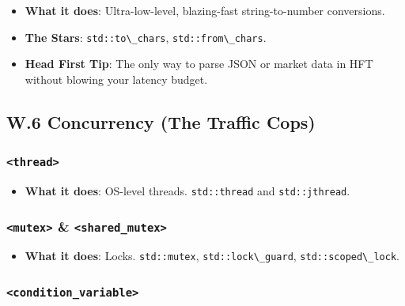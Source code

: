 \begin{itemize}
\tightlist
\item
  \textbf{What it does}: Ultra-low-level, blazing-fast string-to-number
  conversions.
\item
  \textbf{The Stars}: \passthrough{\lstinline!std::to\_chars!},
  \passthrough{\lstinline!std::from\_chars!}.
\item
  \textbf{Head First Tip}: The only way to parse JSON or market data in
  HFT without blowing your latency budget.
\end{itemize}

\hypertarget{w.6-concurrency-the-traffic-cops}{%
\subsection{W.6 Concurrency (The Traffic
Cops)}\label{w.6-concurrency-the-traffic-cops}}

\hypertarget{thread}{%
\subsubsection{\texorpdfstring{\texttt{\textless{}thread\textgreater{}}}{\textless thread\textgreater{}}}\label{thread}}

\begin{itemize}
\tightlist
\item
  \textbf{What it does}: OS-level threads.
  \passthrough{\lstinline!std::thread!} and
  \passthrough{\lstinline!std::jthread!}.
\end{itemize}

\hypertarget{mutex-shared_mutex}{%
\subsubsection{\texorpdfstring{\texttt{\textless{}mutex\textgreater{}}
\&
\texttt{\textless{}shared\_mutex\textgreater{}}}{\textless mutex\textgreater{} \& \textless shared\_mutex\textgreater{}}}\label{mutex-shared_mutex}}

\begin{itemize}
\tightlist
\item
  \textbf{What it does}: Locks. \passthrough{\lstinline!std::mutex!},
  \passthrough{\lstinline!std::lock\_guard!},
  \passthrough{\lstinline!std::scoped\_lock!}.
\end{itemize}

\hypertarget{condition_variable}{%
\subsubsection{\texorpdfstring{\texttt{\textless{}condition\_variable\textgreater{}}}{\textless condition\_variable\textgreater{}}}\label{condition_variable}}

